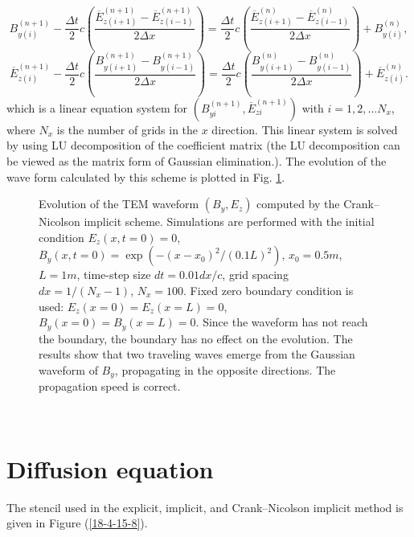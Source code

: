 \documentclass{article}
\begin{document}
\begin{equation}
  B_{y (i)}^{(n + 1)} - \frac{\Delta t}{2} c \left( \frac{\overline{E}_{z (i +
  1)}^{(n + 1)} - \overline{E}_{z (i - 1)}^{(n + 1)}}{2 \Delta x} \right) =
  \frac{\Delta t}{2} c \left( \frac{\overline{E}_{z (i + 1)}^{(n)} -
  \overline{E}_{z (i - 1)}^{(n)}}{2 \Delta x} \right) + B_{y (i)}^{(n)},
\end{equation}
\begin{equation}
  \overline{E}_{z (i)}^{(n + 1)} - \frac{\Delta t}{2} c \left( \frac{B_{y (i +
  1)}^{(n + 1)} - B_{y (i - 1)}^{(n + 1)}}{2 \Delta x} \right) = \frac{\Delta
  t}{2} c \left( \frac{B_{y (i + 1)}^{(n)} - B_{y (i - 1)}^{(n)}}{2 \Delta x}
  \right) + \overline{E}_{z (i)}^{(n)} .
\end{equation}
which is a linear equation system for $(B_{y i}^{(n + 1)}, \overline{E}_{z
i}^{(n + 1)})$ with $i = 1, 2, \ldots N_x$, where $N_x$ is the number of grids
in the $x$ direction. This linear system is solved by using LU decomposition
of the coefficient matrix (the LU decomposition can be viewed as the matrix
form of Gaussian elimination.). The evolution of the wave form calculated by
this scheme is plotted in Fig. \ref{18-4-9-1}.

\begin{figure}[h]
  \caption{\label{18-4-9-1}Evolution of the TEM waveform $(B_y, E_z)$ computed
  by the Crank--Nicolson implicit scheme. Simulations are performed with the
  initial condition $E_z (x, t = 0) = 0$, $B_y (x, t = 0) = \exp (- (x -
  x_0)^2 / (0.1 L)^2)$, $x_0 = 0.5 m$, $L = 1 m$, time-step size $d t = 0.01 d
  x / c$, grid spacing $d x = 1 / (N_x - 1)$, $N_x = 100$. Fixed zero boundary
  condition is used: $E_z (x = 0) = E_z (x = L) = 0$, $B_y (x = 0) = B_y (x =
  L) = 0$. Since the waveform has not reach the boundary, the boundary has no
  effect on the evolution. The results show that two traveling waves emerge
  from the Gaussian waveform of $B_y$, propagating in the opposite directions.
  The propagation speed is correct.}
\end{figure}

\

\section{Diffusion equation}

The stencil used in the explicit, implicit, and Crank--Nicolson implicit
method is given in Figure (\ref{18-4-15-8}).
\end{document}
